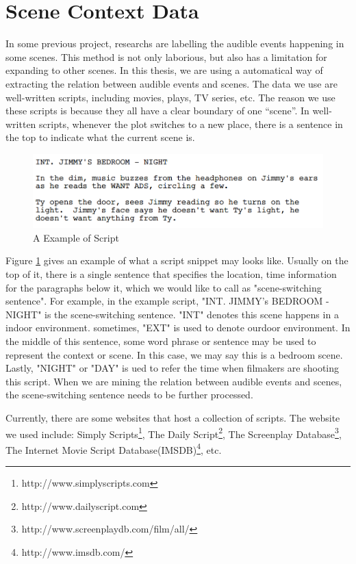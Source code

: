 \section{Scene Context Data}
In some previous project, researchs are labelling the audible events happening in some scenes. 
This method is not only laborious, but also has a limitation for expanding to other scenes.
In this thesis, we are using a automatical way of extracting the relation between audible events and scenes.
The data we use are well-written scripts, including movies, plays, TV series, etc. 
The reason we use these scripts is because they all have a clear boundary of one ``scene''. 
In well-written scripts, whenever the plot switches to a new place, there is a sentence in the top to indicate what the current scene is. 
\begin{figure}[htb]
\centering
\includegraphics[scale=0.6]{figure/dataprep/script}
\caption{A Example of Script}
\label{fig:script}
\end{figure}

Figure \ref{fig:script} gives an example of what a script snippet may looks like. Usually on the top of it, there is a single sentence that specifies the location, time information for the paragraphs below it, which we would like to call as "scene-switching sentence". 
For example, in the example script, "INT. JIMMY's BEDROOM - NIGHT" is the scene-switching sentence. 
"INT" denotes this scene happens in a indoor environment. 
sometimes, "EXT" is used to denote ourdoor environment. 
In the middle of this sentence, some word phrase or sentence may be used to represent the context or scene. 
In this case, we may say this is a bedroom scene. 
Lastly, "NIGHT" or "DAY" is ued to refer the time when filmakers are shooting this script. 
When we are mining the relation between audible events and scenes, the scene-switching sentence needs to be further processed. 

Currently, there are some websites that host a collection of scripts. 
The website we used include: Simply Scripts\footnote{http://www.simplyscripts.com}, The Daily Script\footnote{http://www.dailyscript.com}, The Screenplay Database\footnote{http://www.screenplaydb.com/film/all/}, The Internet Movie Script Database(IMSDB)\footnote{http://www.imsdb.com/}, etc. 

